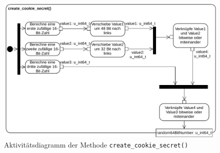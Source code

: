 \documentclass[../review_2.tex]{subfiles}
\begin{document}
\begin{figure}[H]
    \centering
    \includegraphics[width=\linewidth]{img/create_cookie_secret_neu.pdf}
    \caption{Aktivitätsdiagramm der Methode \texttt{create\_cookie\_secret()}}
    \label{createcookiesecret}
\end{figure}
\end{document}
